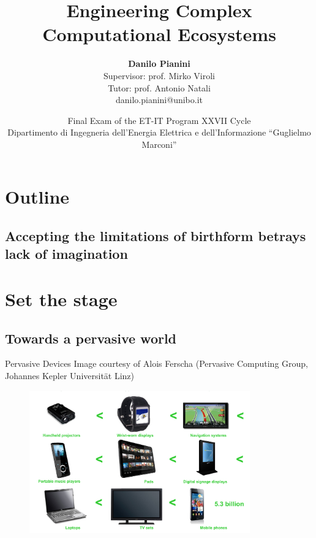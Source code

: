 \documentclass[presentation]{beamer}\mode<presentation>{\usetheme{sapere}}
\title[Engineering Computational Ecosystems]{Engineering Complex Computational Ecosystems}
\author[Danilo Pianini]
{\textbf{Danilo Pianini} \\ Supervisor: prof. Mirko Viroli \\ Tutor: prof. Antonio Natali
\\
\footnotesize danilo.pianini@unibo.it}
\institute[UniBo]
{\textsc{Alma Mater Studiorum}---Universit\`a di Bologna \\
}
\date[\today{} / Bologna]{Final Exam of the ET-IT Program XXVII Cycle \\ Dipartimento di Ingegneria dell'Energia Elettrica e dell'Informazione ``Guglielmo Marconi''}
\begin{document}
\frame[label=coverpage]{\titlepage}

\section*{Outline}
\subsection*{Accepting the limitations of birthform betrays lack of imagination}
\frame{\tableofcontents}


\section{Set the stage}

\subsection{Towards a pervasive world}

\begin{frame}{Pervasive Devices}
  \centering
  \scriptsize
  Image courtesy of Alois Ferscha (Pervasive Computing Group, Johannes Kepler Universität Linz)
  \begin{figure}
    \includegraphics[width=0.85\textwidth]{imgs/devices} 
  \end{figure}
\end{frame}
\end{document}
